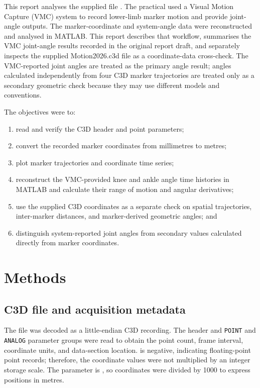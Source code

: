 \documentclass[12pt,a4paper]{article}
\newcommand{\file}[1]{\texttt{\detokenize{#1}}}
\begin{document}
This report analyses the supplied file \file{Motion2026.c3d}. The practical used a Visual Motion Capture (VMC) system to record lower-limb marker motion and provide joint-angle outputs. The marker-coordinate and system-angle data were reconstructed and analysed in MATLAB. This report describes that workflow, summarises the VMC joint-angle results recorded in the original report draft, and separately inspects the supplied Motion2026.c3d file as a coordinate-data cross-check. The VMC-reported joint angles are treated as the primary angle result; angles calculated independently from four C3D marker trajectories are treated only as a secondary geometric check because they may use different models and conventions.

The objectives were to:
\begin{enumerate}
  \item read and verify the C3D header and point parameters;
  \item convert the recorded marker coordinates from millimetres to metres;
  \item plot marker trajectories and coordinate time series;
  \item reconstruct the VMC-provided knee and ankle angle time histories in MATLAB and calculate their range of motion and angular derivatives;
  \item use the supplied C3D coordinates as a separate check on spatial trajectories, inter-marker distances, and marker-derived geometric angles; and
  \item distinguish system-reported joint angles from secondary values calculated directly from marker coordinates.
\end{enumerate}

\section{Methods}

\subsection{C3D file and acquisition metadata}

The file was decoded as a little-endian C3D recording. The header and \texttt{POINT} and \texttt{ANALOG} parameter groups were read to obtain the point count, frame interval, coordinate units, and data-section location. \file{POINT:SCALE} is negative, indicating floating-point point records; therefore, the coordinate values were not multiplied by an integer storage scale. The \file{POINT:UNITS} parameter is \file{mm}, so coordinates were divided by 1000 to express positions in metres.
\end{document}
